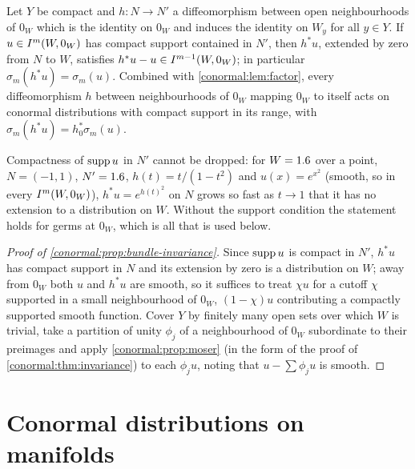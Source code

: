 \begin{proposition}\label{conormal:prop:bundle-invariance}
  Let $Y$ be compact and $h:N\to N'$ a diffeomorphism between open
  neighbourhoods of $0_W$ which is the identity on $0_W$ and induces the
  identity on $W_y$ for all $y\in Y$.  If $u\in I^{m}(W,0_W)$ has compact
  support contained in $N'$, then $h^*u$, extended by zero from $N$ to $W$,
  satisfies $h^*u-u\in I^{m-1}(W,0_W)$; in particular
  $\sigma_m(h^*u)=\sigma_m(u)$.  Combined with \cref{conormal:lem:factor},
  every diffeomorphism $h$ between neighbourhoods of $0_W$ mapping $0_W$ to
  itself acts on conormal distributions with compact support in its range,
  with $\sigma_m(h^*u)=h_0^*\sigma_m(u)$.
\end{proposition}
\begin{remark}
  Compactness of $\operatorname{supp} u$ in $N'$ cannot be dropped: for $W=1.6$ over a
  point, $N=(-1,1)$, $N'=1.6$, $h(t)=t/(1-t^2)$ and $u(x)=e^{x^2}$ (smooth, so
  in every $I^{m}(W,0_W)$), $h^*u=e^{h(t)^2}$ on $N$ grows so fast as
  $t\to1$ that it has no extension to a distribution on $W$. Without the
  support condition the statement holds for germs at $0_W$, which is all that
  is used below.
\end{remark}
\begin{proof}[Proof of \cref{conormal:prop:bundle-invariance}]
  Since $\operatorname{supp} u$ is compact in $N'$, $h^*u$ has compact support in $N$ and
  its extension by zero is a distribution on $W$; away from $0_W$ both $u$
  and $h^*u$ are smooth, so it suffices to treat $\chi u$ for a cutoff $\chi$
  supported in a small neighbourhood of $0_W$, $(1-\chi)u$ contributing a
  compactly supported smooth function.
  Cover $Y$ by finitely many open sets over which $W$ is trivial, take a
  partition of unity $\phi_j$ of a neighbourhood of $0_W$ subordinate to their
  preimages and apply \cref{conormal:prop:moser} (in the form of the proof of
  \cref{conormal:thm:invariance}) to each $\phi_ju$, noting that $u-\sum\phi_ju$
  is smooth.
\end{proof}

\section{Conormal distributions on manifolds}\label{conormal:sec:manifold}

